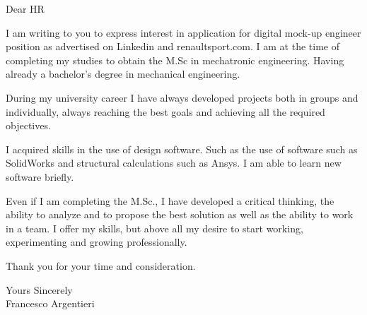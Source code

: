 \documentclass[a4paper,english]{friggeri-letter}
\begin{document}

\address{
   Circonvallazione Istoniense, 20 \\
   Vasto (CH), 66054 \\
   Italy
}




\opening{Dear HR}

I am writing to you to express interest in application for digital mock-up
engineer position as advertised on Linkedin and renaultsport.com. I am at the
time of completing my studies to obtain the M.Sc in mechatronic engineering.
Having already a bachelor's degree in mechanical engineering.

During my university career I have always developed projects both in groups and
individually, always reaching the best goals and achieving all the required
objectives.

I acquired skills in the use of design software. Such as the use of software
such as SolidWorks and structural calculations such as Ansys. I am able to learn
new software briefly.

Even if I am completing the M.Sc., I have developed a critical thinking, the
ability to analyze and to propose the best solution as well as the ability to
work in a team. I offer my skills, but above all my desire to start working,
experimenting and growing professionally.

Thank you for your time and consideration.

\closing{
   Yours Sincerely\\
   Francesco Argentieri}
\end{document}
